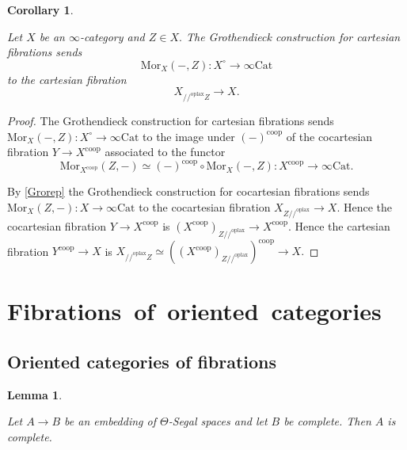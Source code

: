\documentclass[10pt,oneside]{article}
\numberwithin{equation}{section} %
\numberwithin{figure}{section} %
\theoremstyle{plain}
\newtheorem{lemma}[theorem]{Lemma}
\newtheorem{corollary}[theorem]{Corollary}
\theoremstyle{definition}
\newcommand{\X}{X}
\newcommand{\Cat}{\mathrm{Cat}}
\newcommand{\oplax}{{\mathrm{oplax}}}
\newcommand{\coop}{\mathrm{coop}}
\newcommand{\Mor}{{\mathrm{Mor}}}
\begin{document}
\begin{corollary}\label{Grorep2}

Let $X$ be an $\infty$-category and $Z \in X.$
The Grothendieck construction for cartesian fibrations sends 
$$ \Mor_\X(-,Z): X^\circ \to \infty\Cat $$ 
to the cartesian fibration $$ X_{//^\oplax Z} \to X. $$

\end{corollary}

\begin{proof}

The Grothendieck construction for cartesian fibrations sends 
$ \Mor_\X(-,Z): X^\circ \to \infty\Cat $ 
to the image under $(-)^\coop$ of the cocartesian fibration $Y \to X^\coop$ associated to the functor $$\Mor_{\X^\coop}(Z,-) \simeq (-)^\coop \circ \Mor_\X(-,Z) : X^\coop \to \infty\Cat.$$ 

By \cref{Grorep} the Grothendieck construction for cocartesian fibrations sends 
$ \Mor_\X(Z,-): X \to \infty\Cat $
to the cocartesian fibration $ X_{Z //^\oplax} \to X.$ 
Hence the cocartesian fibration $Y \to X^\coop$ is $ (X^\coop)_{Z //^\oplax} \to X^\coop.$ 
Hence the cartesian fibration $Y^\coop \to X$ is $X_{//^\oplax Z} \simeq ((X^\coop)_{Z //^\oplax})^\coop \to X.$ 
\end{proof}


\section{\mbox{Fibrations of oriented categories}}


\subsection{Oriented categories of fibrations}

\begin{lemma}\label{comple}

Let $A \to B$ be an embedding of $\Theta$-Segal spaces and let $B$ be complete. Then $A$ is complete.
    
\end{lemma}
\end{document}
